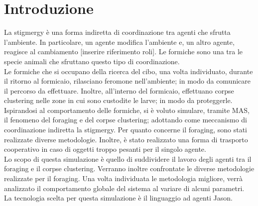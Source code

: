 \documentclass[12pt,a4paper,openright,twoside]{report}
\begin{document}
	\chapter*{Introduzione}                 %

La stigmergy è una forma indiretta di coordinazione tra agenti che sfrutta l'ambiente. In particolare, un agente modifica l'ambiente e, un altro agente, reagisce al cambiamento [inserire riferimento roli]. Le formiche sono una tra le specie animali che sfruttano questo tipo di coordinazione.\\
Le formiche che si occupano della ricerca del cibo, una volta individuato, durante il ritorno al formicaio, rilasciano feromone nell'ambiente; in modo da comunicare il percorso da effettuare. Inoltre, all'interno del formicaio, effettuano corpse clustering nelle zone in cui sono custodite le larve; in modo da proteggerle.\\
Ispirandosi al comportamento delle formiche, si è voluto simulare, tramite MAS, il fenomeno del foraging e del corpse clustering; adottando come meccanismo di coordinazione indiretta la stigmergy. Per quanto concerne il foraging, sono stati realizzate diverse metodologie. Inoltre, è stato realizzato una forma di trasporto cooperativo in caso di oggetti troppo pesanti per il singolo agente.\\
Lo scopo di questa simulazione è quello di suddividere il lavoro degli agenti tra il foraging e il corpse clustering. Verranno inoltre confrontate le diverse metodologie realizzate per il foraging. Una volta individuata le metodologia migliore, verrà analizzato il comportamento globale del sistema al variare di alcuni parametri.\\
La tecnologia scelta per questa simulazione è il linguaggio ad agenti Jason.
	\clearpage{\pagestyle{empty}\cleardoublepage}
	\tableofcontents                        %
	\rhead[\fancyplain{}{\bfseries\leftmark}]{\fancyplain{}{\bfseries\thepage}}
	\clearpage{\pagestyle{empty}\cleardoublepage}
	\clearpage{\pagestyle{empty}\cleardoublepage}
	\clearpage{\pagestyle{empty}\cleardoublepage}
\end{document}
